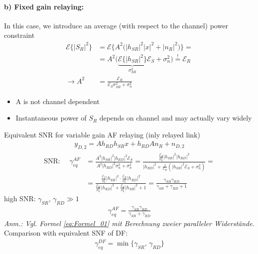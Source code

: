 \documentclass[a4paper, 10pt]{article}
\begin{document}
\paragraph{b) Fixed gain relaying:} In this case, we introduce an average (with respect to the channel) power constraint
\begin{align*}
	\mathcal{E}\bigl\{|S_R|^2\bigr\} &= \mathcal{E}\bigl\{A^2\bigl(|h_{SR}|^2|x|^2 + |n_R|^2\bigr)\bigr\} = \\ &= A^2\bigl( \underbrace{\mathcal{E}\bigl\{|h_{SR}|^2\bigr\}}_{\sigma_{SR}^2}\mathcal{E}_S + \sigma_n^2\bigr) \overset{!}{=} \mathcal{E}_R \\ \rightarrow A^2 &= \frac{\mathcal{E}_R}{\mathcal{E}_S\sigma_{SR}^2 + \sigma_n^2}	 
\end{align*}
\begin{itemize}
	\item A is not channel dependent
	\item Instantaneous power of $S_R $ depends on channel and may actually vary widely
\end{itemize}
Equivalent SNR for variable gain AF relaying (inly relayed link)
\begin{align*}
	y_{D,2} = Ah_{RD}h_{SR}x + h_{RD}An_R + n_{D,2}
\end{align*}
\begin{align*}
	\text{SNR: }\quad \gamma_{eq}^{AF} &= \frac{A^2|h_{SR}|^2|h_{RD}|^2\mathcal{E}_S}{A^2|h_{RD}|^2\sigma_n^2 + \sigma_n^2} = \frac{\frac{\mathcal{E}_S}{\sigma_n^2}|h_{SR}|^2|h_{RD}|^2}{|h_{RD}|^2 + \frac{1}{\mathcal{E}_R}(|h_{SR}|^2\mathcal{E}_S + \sigma_n^2)} = \\ &= \frac{\frac{\mathcal{E}_S}{\sigma_n^2}|h_{SR}|^2\cdot\frac{\mathcal{E}_R}{\sigma_n^2}|h_{RD}|^2}{\frac{\mathcal{E}_R}{\sigma_n^2}|h_{RD}|^2 + \frac{\mathcal{E}_S}{\sigma_n^2}|h_{SR}|^2 + 1} =  \frac{\gamma_{SR}\gamma_{RD}}{\gamma_{SR} + \gamma_{RD} + 1}
\end{align*}
high SNR: $\gamma_{SR},\,\gamma_{RD} \gg 1 $
\begin{align}
	\boxed{\gamma_{eq}^{AF} = \frac{\gamma_{SR}\gamma_{RD}}{\gamma_{SR} + \gamma_{RD}}} \label{eq:Formel_01}
\end{align}
\textit{Anm.: Vgl. Formel \ref{eq:Formel_01} mit Berechnung zweier paralleler Widerst\"ande.}\\
Comparison with equivalent SNF of DF:
\begin{align}
	\boxed{\gamma_{eq}^{DF} = \min\bigl\{\gamma_{SR},\,\gamma_{RD}\bigr\}}\label{eq:Formel_02}
\end{align}
\end{document}

